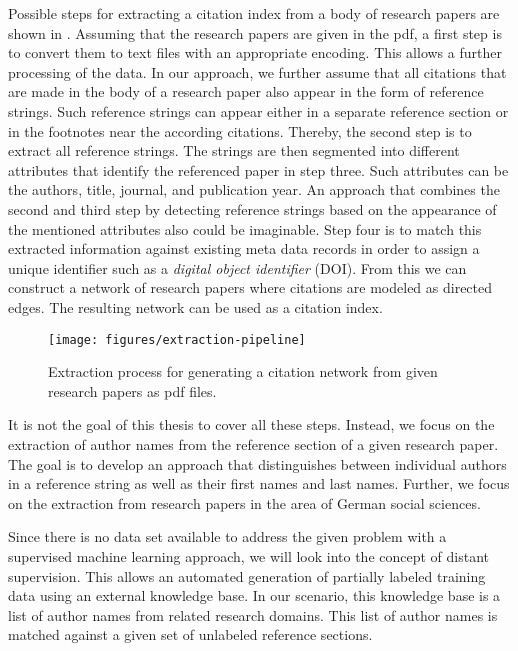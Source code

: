 Possible steps for extracting a citation index from a body of research papers are shown in .
Assuming that the research papers are given in the \gls{pdf}, a first step is to convert them to text files with an appropriate encoding.
This allows a further processing of the data.
In our approach, we further assume that all citations that are made in the body of a research paper also appear in the form of reference strings.
Such reference strings can appear either in a separate reference section or in the footnotes near the according citations.
Thereby, the second step is to extract all reference strings.
The strings are then segmented into different attributes that identify the referenced paper in step three.
Such attributes can be the authors, title, journal, and publication year.
An approach that combines the second and third step by detecting reference strings based on the appearance of the mentioned attributes also could be imaginable.
Step four is to match this extracted information against existing meta data records in order to assign a unique identifier such as a \textit{digital object identifier} (DOI).
From this we can construct a network of research papers where citations are modeled as directed edges.
The resulting network can be used as a citation index.
\begin{figure}[t]
\texttt{[image: figures/extraction-pipeline]}
\caption{Extraction process for generating a citation network from given research papers as \gls{pdf} files.}
\label{fig:extraction-pipeline}
\end{figure}

It is not the goal of this thesis to cover all these steps.
Instead, we focus on the extraction of author names from the reference section of a given research paper.
The goal is to develop an approach that distinguishes between individual authors in a reference string as well as their first names and last names.
Further, we focus on the extraction from research papers in the area of German social sciences.

\bigskip

Since there is no data set available to address the given problem with a supervised machine learning approach, we will look into the concept of \gls{distant supervision}.
This allows an automated generation of partially labeled training data using an external knowledge base.
In our scenario, this knowledge base is a list of author names from related research domains.
This list of author names is matched against a given set of unlabeled reference sections.

